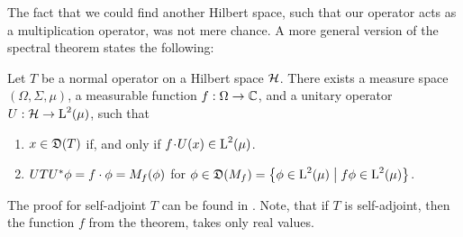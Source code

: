 The fact that we could find another Hilbert space, such that our operator
acts as a multiplication operator, was not mere chance. A more general 
version of the spectral theorem states the following:

\begin{thrm}

Let $T$ be a normal operator on a Hilbert space $\mathcal{H}$. There exists
a measure space $(\Omega, \Sigma, \mu)$, a measurable function 
$f: \Omega \to \mathbb{C}$, and a unitary operator $U: \mathcal{H} \to \text{L}^2(\mu)$,
such that
\begin{enumerate}[\normalfont (a)]
 \item $x \in \mathfrak{D}(T)$ if, and only if $f\! \cdot\! U(x) \in \text{L}^2(\mu)$.
 \item $UTU^{*} \phi = f \cdot \phi = M_f(\phi)$ for 
 $\phi \in \mathfrak{D}(M_f) 
 = \left\lbrace \phi \in \text{L}^2(\mu) \bigm | f\phi \in \text{L}^2(\mu) \right\rbrace$.
\end{enumerate}
\end{thrm}
The proof for self-adjoint $T$ can be found in \cite[Ch. VII.4]{WernerFunkAna}.
Note, that if $T$ is self-adjoint, then the function $f$ from the theorem, 
takes only real values.






























